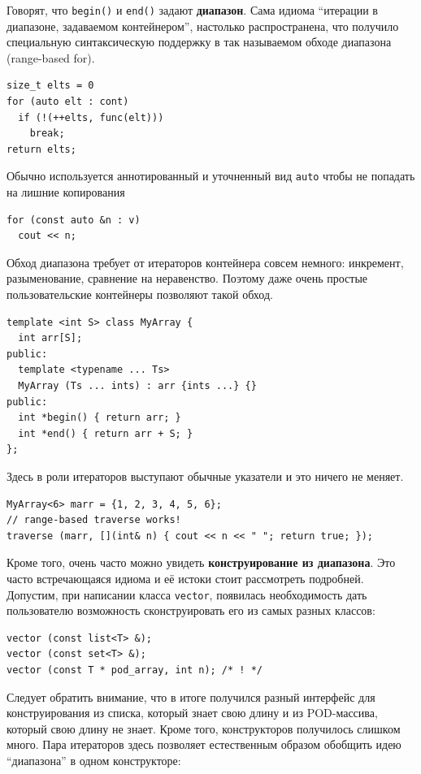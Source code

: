 \documentclass[a4paper,12pt,oneside]{article}
\begin{document}
Говорят, что \lstinline!begin()! и \lstinline!end()! задают \textbf{диапазон}. Сама идиома ``итерации в диапазоне, задаваемом контейнером'', настолько распространена, что получило специальную синтаксическую поддержку в так называемом обходе диапазона (range-based for).

\begin{lstlisting}
size_t elts = 0
for (auto elt : cont)
  if (!(++elts, func(elt)))
    break;
return elts;
\end{lstlisting}

Обычно используется аннотированный и уточненный вид  \lstinline!auto! чтобы не попадать на лишние копирования

\begin{lstlisting}
for (const auto &n : v)
  cout << n;
\end{lstlisting}

Обход диапазона требует от итераторов контейнера совсем немного: инкремент, разыменование, сравнение на неравенство. Поэтому даже очень простые пользовательские контейнеры позволяют такой обход.

\begin{lstlisting}
template <int S> class MyArray {
  int arr[S];
public:
  template <typename ... Ts>
  MyArray (Ts ... ints) : arr {ints ...} {}
public:
  int *begin() { return arr; }
  int *end() { return arr + S; }
};
\end{lstlisting}

Здесь в роли итераторов выступают обычные указатели и это ничего не меняет.

\begin{lstlisting}
MyArray<6> marr = {1, 2, 3, 4, 5, 6};
// range-based traverse works!
traverse (marr, [](int& n) { cout << n << " "; return true; });
\end{lstlisting}

Кроме того, очень часто можно увидеть \textbf{конструирование из диапазона}. Это часто встречающаяся идиома и её истоки стоит рассмотреть подробней. Допустим, при написании класса \lstinline!vector!, появилась необходимость дать пользователю возможность сконструировать его из самых разных классов:

\begin{lstlisting}
vector (const list<T> &); 
vector (const set<T> &); 
vector (const T * pod_array, int n); /* ! */
\end{lstlisting}

Следует обратить внимание, что в итоге получился разный интерфейс для конструирования из списка, который знает свою длину и из POD-массива, который свою длину не знает. Кроме того, конструкторов получилось слишком много. Пара итераторов здесь позволяет естественным образом обобщить идею ``диапазона'' в одном конструкторе:
\end{document}
